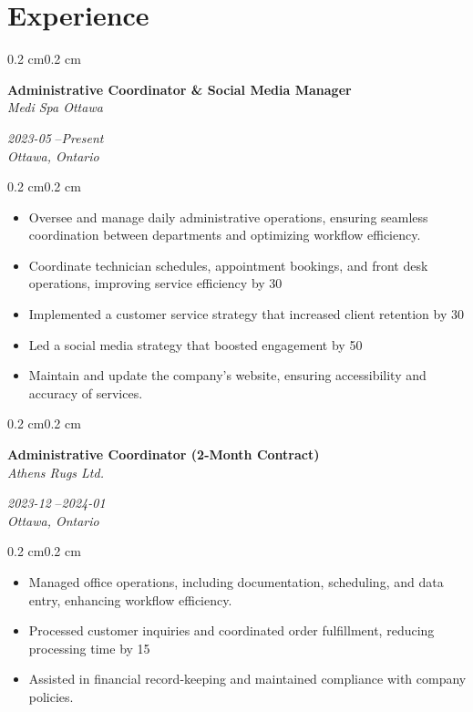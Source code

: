 \documentclass[10pt, letterpaper]{article}
\newenvironment{highlights}{%
    \begin{itemize}[
        topsep=0.10 cm,%
        parsep=0.10 cm,%
        partopsep=0pt,%
        itemsep=0pt,%
        leftmargin=0.4 cm + 10pt%
    ]
}{%
    \end{itemize}%
}
\newenvironment{onecolentry}{%
    \begin{adjustwidth}{0.2 cm}{0.2 cm}%
}{%
    \end{adjustwidth}%
}
\newenvironment{twocolentry}[1]{%
    \begin{onecolentry}%
    \def\twocolentryarg{#1}%
    \noindent
    \begin{minipage}[t]{0.68\textwidth} %
}{%
    \end{minipage}\hfill%
    \begin{minipage}[t]{0.30\textwidth} %
      \raggedleft\twocolentryarg
    \end{minipage}%
    \vspace{0.2cm}%
    \end{onecolentry}%
}
\begin{document}
\section{Experience}
\begin{twocolentry}{%
\textit{2023-05 }--\textit{Present} \\[0.1cm]
\textit{Ottawa, Ontario}%
}
    \textbf{Administrative Coordinator & Social Media Manager }\\
    \textit{Medi Spa Ottawa }
\end{twocolentry}
\vspace{0.10 cm}
\begin{onecolentry}
    \begin{highlights}
        \item Oversee and manage daily administrative operations, ensuring seamless coordination between departments and optimizing workflow efficiency.
        \item Coordinate technician schedules, appointment bookings, and front desk operations, improving service efficiency by 30%
        \item Implemented a customer service strategy that increased client retention by 30%
        \item Led a social media strategy that boosted engagement by 50%
        \item Maintain and update the company’s website, ensuring accessibility and accuracy of services.
    \end{highlights}
\end{onecolentry}
\vspace{0.2 cm}
\begin{twocolentry}{%
\textit{2023-12 }--\textit{2024-01} \\[0.1cm]
\textit{Ottawa, Ontario}%
}
    \textbf{Administrative Coordinator (2-Month Contract) }\\
    \textit{Athens Rugs Ltd. }
\end{twocolentry}
\vspace{0.10 cm}
\begin{onecolentry}
    \begin{highlights}
        \item Managed office operations, including documentation, scheduling, and data entry, enhancing workflow efficiency.
        \item Processed customer inquiries and coordinated order fulfillment, reducing processing time by 15%
        \item Assisted in financial record-keeping and maintained compliance with company policies.
    \end{highlights}
\end{onecolentry}
\end{document}
